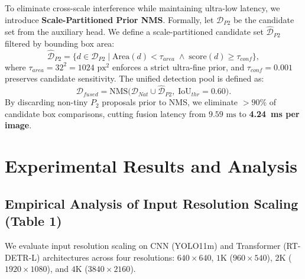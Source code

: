 \documentclass[runningheads]{llncs}
\begin{document}
To eliminate cross-scale interference while maintaining ultra-low latency, we introduce \textbf{Scale-Partitioned Prior NMS}. Formally, let $\mathcal{D}_{P2}$ be the candidate set from the auxiliary head. We define a scale-partitioned candidate set $\hat{\mathcal{D}}_{P2}$ filtered by bounding box area:
\begin{equation}
    \hat{\mathcal{D}}_{P2} = \Big\{ d \in \mathcal{D}_{P2} \;\Big|\; \text{Area}(d) < \tau_{area} \;\land\; \text{score}(d) \ge \tau_{conf} \Big\},
\end{equation}
where $\tau_{area} = 32^2 = 1024\text{ px}^2$ enforces a strict ultra-fine prior, and $\tau_{conf} = 0.001$ preserves candidate sensitivity. The unified detection pool is defined as:
\begin{equation}
    \mathcal{D}_{fused} = \text{NMS}\big( \mathcal{D}_{Nat} \cup \hat{\mathcal{D}}_{P2}, \;\text{IoU}_{thr} = 0.60 \big).
\end{equation}
By discarding non-tiny $P_2$ proposals prior to NMS, we eliminate $>90\%$ of candidate box comparisons, cutting fusion latency from $9.59\text{ ms}$ to \textbf{4.24~ms per image}.

\section{Experimental Results and Analysis}

\subsection{Empirical Analysis of Input Resolution Scaling (Table 1)}
We evaluate input resolution scaling on CNN (YOLO11m) and Transformer (RT-DETR-L) architectures across four resolutions: $640\times 640$, $1\text{K}$ ($960\times 540$), $2\text{K}$ ($1920\times 1080$), and $4\text{K}$ ($3840\times 2160$).
\end{document}
